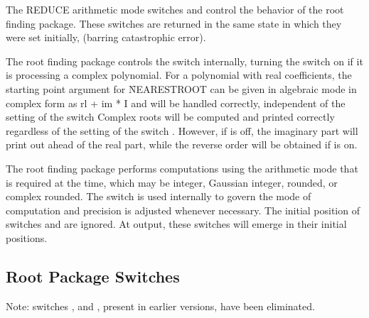 The REDUCE arithmetic mode switches  and 
control the behavior of the root finding package.
These switches are returned in the same state in which they were set
initially, (barring catastrophic error).

\begin{description}
\item[COMPLEX] The root finding package controls the switch 
internally, turning the switch on if it is processing a complex
polynomial.
For a polynomial with real coefficients, the
starting point argument for \f{NEARESTROOT} can be given in algebraic mode in
complex form as rl + im * I and will be handled correctly, independent of
the setting of the switch  Complex roots will be computed
and printed correctly regardless of the setting of the switch .  
However, if  is off, the imaginary part will print
out ahead of the real part, while the reverse order will be obtained if
 is on.

\item[ROUNDED] The
root finding package performs computations using the arithmetic mode that
is required at the time, which may be integer, Gaussian integer, rounded,
or complex rounded.  The switch  is used internally to govern
the mode of computation and precision is adjusted whenever necessary.  The
initial position of switches  and  are ignored.
At output, these switches will emerge in their initial positions.
\end{description}

\subsection{Root Package Switches}

Note: switches ,  and , present in
earlier versions, have been eliminated.


